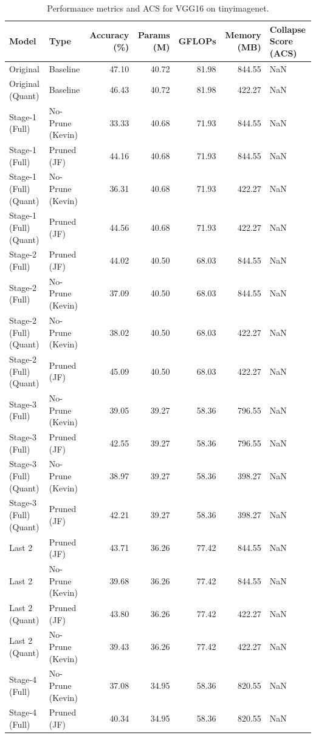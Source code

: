 \begin{table}
\caption{Performance metrics and ACS for VGG16 on tinyimagenet.}
\label{tab:VGG16_tinyimagenet}
\begin{tabular}{llrrrrl}
\toprule
Model & Type & Accuracy (\%) & Params (M) & GFLOPs & Memory (MB) & Collapse Score (ACS) \\
\midrule
Original & Baseline & 47.10 & 40.72 & 81.98 & 844.55 & NaN \\
Original
(Quant) & Baseline & 46.43 & 40.72 & 81.98 & 422.27 & NaN \\
Stage-1 (Full) & No-Prune (Kevin) & 33.33 & 40.68 & 71.93 & 844.55 & NaN \\
Stage-1 (Full) & Pruned (JF) & 44.16 & 40.68 & 71.93 & 844.55 & NaN \\
Stage-1 (Full)
(Quant) & No-Prune (Kevin) & 36.31 & 40.68 & 71.93 & 422.27 & NaN \\
Stage-1 (Full)
(Quant) & Pruned (JF) & 44.56 & 40.68 & 71.93 & 422.27 & NaN \\
Stage-2 (Full) & Pruned (JF) & 44.02 & 40.50 & 68.03 & 844.55 & NaN \\
Stage-2 (Full) & No-Prune (Kevin) & 37.09 & 40.50 & 68.03 & 844.55 & NaN \\
Stage-2 (Full)
(Quant) & No-Prune (Kevin) & 38.02 & 40.50 & 68.03 & 422.27 & NaN \\
Stage-2 (Full)
(Quant) & Pruned (JF) & 45.09 & 40.50 & 68.03 & 422.27 & NaN \\
Stage-3 (Full) & No-Prune (Kevin) & 39.05 & 39.27 & 58.36 & 796.55 & NaN \\
Stage-3 (Full) & Pruned (JF) & 42.55 & 39.27 & 58.36 & 796.55 & NaN \\
Stage-3 (Full)
(Quant) & No-Prune (Kevin) & 38.97 & 39.27 & 58.36 & 398.27 & NaN \\
Stage-3 (Full)
(Quant) & Pruned (JF) & 42.21 & 39.27 & 58.36 & 398.27 & NaN \\
Last 2 & Pruned (JF) & 43.71 & 36.26 & 77.42 & 844.55 & NaN \\
Last 2 & No-Prune (Kevin) & 39.68 & 36.26 & 77.42 & 844.55 & NaN \\
Last 2
(Quant) & Pruned (JF) & 43.80 & 36.26 & 77.42 & 422.27 & NaN \\
Last 2
(Quant) & No-Prune (Kevin) & 39.43 & 36.26 & 77.42 & 422.27 & NaN \\
Stage-4 (Full) & No-Prune (Kevin) & 37.08 & 34.95 & 58.36 & 820.55 & NaN \\
Stage-4 (Full) & Pruned (JF) & 40.34 & 34.95 & 58.36 & 820.55 & NaN \\

\end{tabular}
\end{table}
